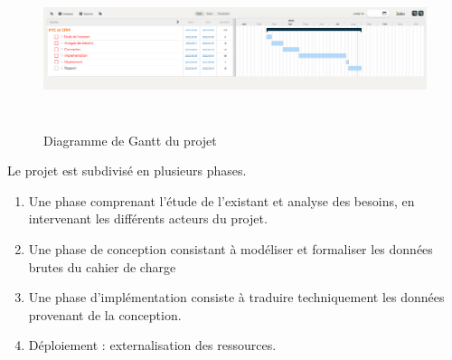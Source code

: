 \begin{figure}[h]
	\includegraphics[scale=0.8,width=500px,height=175px]{./Template LaTeX/Images/gantt.png}
	\centering
	\caption{Diagramme de Gantt du projet}
\end{figure}

Le projet est subdivisé en plusieurs phases.
\begin{enumerate}
	\item Une phase comprenant l’étude de l’existant et analyse des besoins, en
	intervenant les différents acteurs du projet.
	\item Une phase de conception consistant à modéliser et formaliser les
	données brutes du cahier de charge
	\item Une phase d’implémentation consiste à traduire techniquement les
	données provenant de la conception.
	\item Déploiement : externalisation des ressources.
\end{enumerate}


